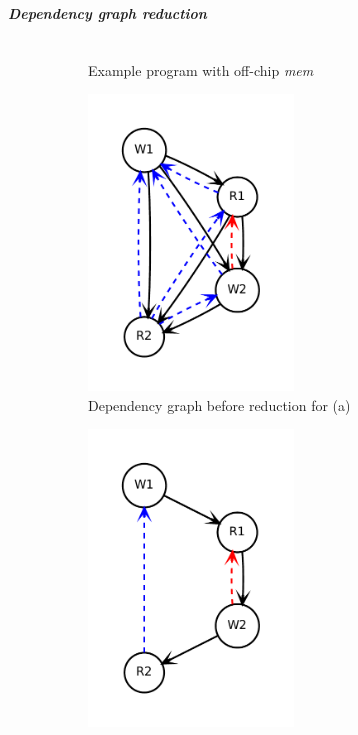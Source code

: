 \subparagraph{Dependency graph reduction}

\begin{figure}
\centering
\begin{subfigure}[b]{0.34\textwidth}
\inputminted{python}{code/graphred1.py}
\caption {
  Example program with off-chip \emph{mem}
}
\end{subfigure}
\begin{subfigure}[b]{0.3\textwidth}
  \centering
\includegraphics[width=0.6\textwidth]{figs/graphred1.pdf}
\caption{
  Dependency graph before reduction for (a)
}
\end{subfigure}
\begin{subfigure}[b]{0.3\textwidth}
  \centering
\includegraphics[width=0.6\textwidth]{figs/graphred1_after.pdf}

\end{subfigure}
\end{figure}
